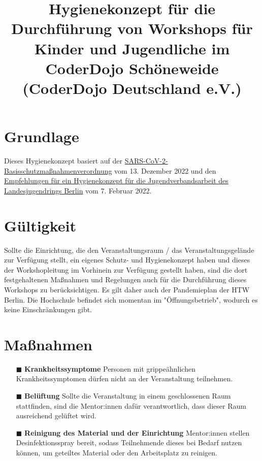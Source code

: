 \documentclass{coderdojoschoeneweide}
\title{Hygienekonzept für die Durchführung von Workshops für Kinder und Jugendliche im CoderDojo Schöneweide (CoderDojo Deutschland e.V.)}
\begin{document}
	\maketitle

	\begin{Form}

		\section*{Grundlage}

		Dieses Hygienekonzept basiert auf der \href{https://www.berlin.de/corona/massnahmen/verordnung/}{SARS-CoV-2-Basisschutzmaßnahmenverordnung} vom 13. Dezember 2022 und den \href{https://ljrberlin.de/corona-jugendarbeit-berlin}{Empfehlungen für ein Hygienekonzept für die Jugendverbandsarbeit des Landesjugendrings Berlin} vom 7. Februar 2022.

		\section*{Gültigkeit}

        Sollte die Einrichtung, die den Veranstaltungsraum / das Veranstaltungsgelände zur Verfügung stellt, ein eigenes Schutz- und Hygienekonzept haben und dieses der Workshopleitung im Vorhinein zur Verfügung gestellt haben, sind die dort festgehaltenen  Maßnahmen und Regelungen auch für die Durchführung dieses Workshops zu berücksichtigen. Es gilt daher auch der Pandemieplan der HTW Berlin. Die Hochschule befindet sich momentan im "Öffnungsbetrieb", wodurch es keine Einschränkungen gibt. 

		\section*{Maßnahmen}

		\begin{itemize}
             \item[$\blacksquare$] \textbf{Krankheitssymptome} Personen mit grippeähnlichen Krankheitssymptomen dürfen nicht an der Veranstaltung teilnehmen.
  
			\item[$\blacksquare$] \textbf{Belüftung} Sollte die Veranstaltung in einem geschlossenen Raum stattfinden, sind die Mentor:innen dafür verantwortlich, dass dieser Raum ausreichend gelüftet wird.

			\item[$\blacksquare$] \textbf{Reinigung des Material und der Einrichtung} Mentor:innen stellen Desinfektionsspray bereit, sodass Teilnehmende dieses bei Bedarf nutzen können, um geteiltes Material oder den Arbeitsplatz zu reinigen.


\end{itemize}
\end{Form}
\end{document}
